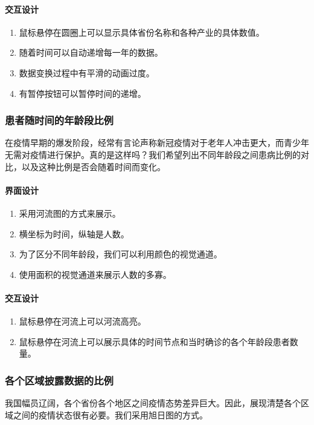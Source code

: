 \documentclass{ctexart}
\begin{document}
\paragraph{交互设计}
\begin{enumerate}
\item 鼠标悬停在圆圈上可以显示具体省份名称和各种产业的具体数值。
\item 随着时间可以自动递增每一年的数据。
\item 数据变换过程中有平滑的动画过度。
\item 有暂停按钮可以暂停时间的递增。
\end{enumerate}

\subsubsection{患者随时间的年龄段比例}
在疫情早期的爆发阶段，经常有言论声称新冠疫情对于老年人冲击更大，而青少年无需对疫情进行保护。真的是这样吗？我们希望列出不同年龄段之间患病比例的对比，以及这种比例是否会随着时间而变化。
\paragraph{界面设计}
\begin{enumerate}
    \item 采用河流图的方式来展示。
    \item 横坐标为时间，纵轴是人数。
    \item 为了区分不同年龄段，我们可以利用颜色的视觉通道。
    \item 使用面积的视觉通道来展示人数的多寡。
\end{enumerate}

\paragraph{交互设计}
\begin{enumerate}
\item 鼠标悬停在河流上可以河流高亮。
\item 鼠标悬停在河流上可以展示具体的时间节点和当时确诊的各个年龄段患者数量。
\end{enumerate}

\subsubsection{各个区域披露数据的比例}
我国幅员辽阔，各个省份各个地区之间疫情态势差异巨大。因此，展现清楚各个区域之间的疫情状态很有必要。我们采用旭日图的方式。
\end{document}
